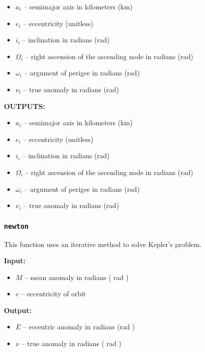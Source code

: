\documentclass[11pt, reqno]{article}    %
\begin{document}
\begin{itemize}
    \item \( a_i \)  -- semimajor axis in kilometers (\si{\kilo\meter})
    \item \( e_i \) -- eccentricity (unitless)
    \item \( i_i \) -- inclination in radians (\si{\radian})
    \item \( \Omega_i \) -- right ascension of the ascending node in radians (\si{\radian})
    \item \( \omega_i \) -- argument of perigee in radians (\si{\radian})
    \item \( \nu_i \) -- true anomaly in radians (\si{\radian})
\end{itemize}

\noindent \textbf{OUTPUTS:}
\begin{itemize}
    \item \( a_i \)  -- semimajor axis in kilometers (\si{\kilo\meter})
    \item \( e_i \) -- eccentricity (unitless)
    \item \( i_i \) -- inclination in radians (\si{\radian})
    \item \( \Omega_i \) -- right ascension of the ascending node in radians (\si{\radian})
    \item \( \omega_i \) -- argument of perigee in radians (\si{\radian})
    \item \( \nu_i \) -- true anomaly in radians (\si{\radian})
\end{itemize}

\subsubsection*{\texttt{newton}}

This function uses an iterative method to solve Kepler's problem.

\noindent\textbf{Input:}
    \begin{itemize}
        \item \( M \) -- mean anomaly in radians ( \si{\radian} )
        \item \( e \) -- eccentricity of orbit 
    \end{itemize}

\noindent \textbf{Output:}
\begin{itemize}
    \item \( E \) -- eccentric anomaly in radians (\si{\radian} )
    \item \( \nu \) -- true anomaly in radians ( \si{\radian} )
\end{itemize}
\end{document}
